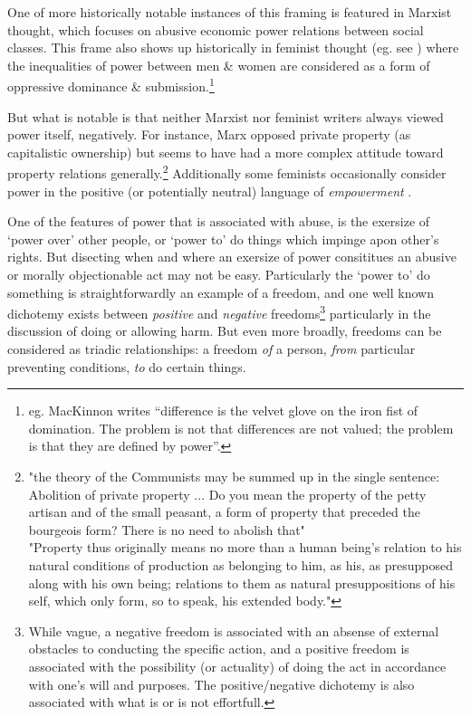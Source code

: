One of more historically notable instances of this framing is featured in Marxist thought, which focuses on abusive economic power relations between social classes. This frame also shows up historically in feminist thought (eg. see \cite{Cudd2006-CUDAO}) where the inequalities of power between men \& women are considered as a form of oppressive dominance \& submission.\footnote{eg. MacKinnon writes ``difference is the velvet glove on the iron fist of domination. The problem is not that differences are not valued; the problem is that they are defined by power''\cite{mackinnon1989toward}.}

But what is notable is that neither Marxist nor feminist writers always viewed power itself, negatively.
For instance, Marx opposed private property (as capitalistic ownership) but seems to have had a more complex attitude toward property relations generally.\footnote{"the theory of the Communists may be summed up in the single sentence: Abolition of private property ... Do you mean the property of the petty artisan and of the small peasant, a form of property that preceded the bourgeois form? There is no need to abolish that"\cite{MarxGutenberg}\\"Property thus originally means no more than a human being's relation to his natural conditions of production as belonging to him, as his, as presupposed along with his own being; relations to them as natural presuppositions of his self, which only form, so to speak, his extended body."\cite[Notebook V]{marx1993grundrisse}}
Additionally some feminists occasionally consider power in the positive (or potentially neutral) language of \textit{empowerment} \cite{doi:10.1111/j.1527-2001.1998.tb01350.x}.

One of the features of power that is associated with abuse, is the exersize of `power over' other people, or `power to' do things which impinge apon other's rights.\cite{doi:10.1111/j.1527-2001.1998.tb01350.x}
But disecting when and where an exersize of power consititues an abusive or morally objectionable act may not be easy.
Particularly the `power to' do something is straightforwardly an example of a freedom, and one well known dichotemy exists between \textit{positive} and \textit{negative} freedoms\footnote{While vague, a negative freedom is associated with an absense of external obstacles to conducting the specific action, and a positive freedom is associated with the possibility (or actuality) of doing the act in accordance with one's will and purposes. The positive/negative dichotemy is also associated with what is or is not effortfull.\cite{Mossel2009-MOSNA}} particularly in the discussion of doing or allowing harm.
But even more broadly, freedoms can be considered as triadic relationships: a freedom \textit{of} a person, \textit{from} particular preventing conditions, \textit{to} do certain things.\cite{Negative_and_Positive_Freedom}

